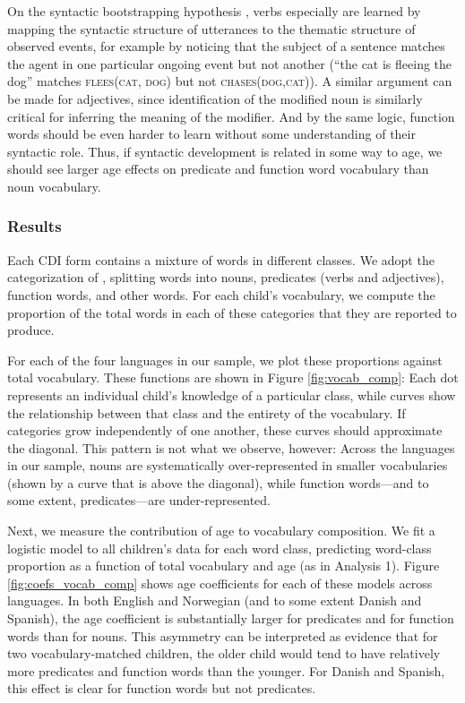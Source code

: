 \documentclass[10pt,letterpaper]{article}
\begin{document}
On the syntactic bootstrapping hypothesis \cite{gleitman1990,fisher2010}, verbs especially are learned by mapping the syntactic structure of utterances to the thematic structure of observed events, for example by noticing that the subject of a sentence matches the agent in one particular ongoing event but not another (``the cat is fleeing the dog'' matches \textsc{flees(cat, dog)} but not \textsc{chases(dog,cat)}). A similar argument can be made for adjectives, since identification of the modified noun is similarly critical for inferring the meaning of the modifier. And by the same logic, function words should be even harder to learn without some understanding of their syntactic role. Thus, if syntactic development is related in some way to age, we should see larger age effects on predicate and function word vocabulary than noun vocabulary. 

\subsubsection{Results}

Each CDI form contains a mixture of words in different classes. We adopt the categorization of , splitting words into nouns, predicates (verbs and adjectives), function words, and other words. For each child's vocabulary, we compute the proportion of the total words in each of these categories that they are reported to produce.

For each of the four languages in our sample, we plot these proportions against total vocabulary. These functions are shown in Figure \ref{fig:vocab_comp}: Each dot represents an individual child's knowledge of a particular class, while curves show the relationship between that class and the entirety of the vocabulary. If categories grow independently of one another, these curves should approximate the diagonal. This pattern is not what we observe, however: Across the languages in our sample, nouns are systematically over-represented in smaller vocabularies (shown by a curve that is above the diagonal), while function words---and to some extent, predicates---are under-represented. 

Next, we measure the contribution of age to vocabulary composition. We fit a logistic model to all children's data for each word class, predicting word-class proportion as a function of total vocabulary and age (as in Analysis 1). Figure \ref{fig:coefs_vocab_comp} shows age coefficients for each of these models across languages. In both English and Norwegian (and to some extent Danish and Spanish), the age coefficient is substantially larger for predicates and for function words than for nouns. This asymmetry can be interpreted as evidence that for two vocabulary-matched children, the older child would tend to have relatively more predicates and function words than the younger. For Danish and Spanish, this effect is clear for function words but not predicates.
\end{document}
